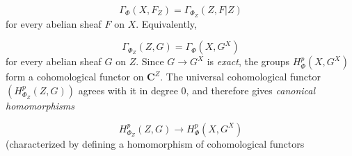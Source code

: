 \[
\Gamma_\Phi(X,F_Z)=\Gamma_{\Phi_Z}(Z,F\vert Z)
\]
for every abelian sheaf $F$ on $X$. Equivalently,

\[
\Gamma_{\Phi_Z}(Z,G)=\Gamma_\Phi(X,G^X)
\]
for every abelian sheaf $G$ on $Z$.
Since $G\to G^X$ is \textit{exact}, the groups $H^p_\Phi(X,G^X)$ form a
cohomological functor on $\mathbf C^Z$. The universal cohomological functor
$(H^p_{\Phi_Z}(Z,G))$ agrees with it in degree 0, and therefore gives
\textit{canonical homomorphisms}

\[
H^p_{\Phi_Z}(Z,G)\to H^p_\Phi(X,G^X)
\]
(characterized by defining a homomorphism of cohomological functors

